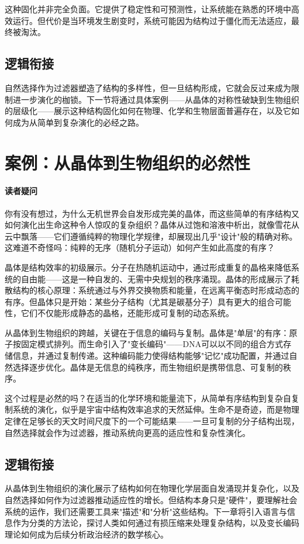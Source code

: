 \documentclass[openany, a4paper, 12pt]{book}
\begin{document}
	这种固化并非完全负面。它提供了稳定性和可预测性，让系统能在熟悉的环境中高效运行。但代价是当环境发生剧变时，系统可能因为结构过于僵化而无法适应，最终被淘汰。
	
	\subsection{逻辑衔接}
	自然选择作为过滤器塑造了结构的多样性，但一旦结构形成，它就会反过来成为限制进一步演化的枷锁。下一节将通过具体案例——从晶体的对称性破缺到生物组织的层级化——展示这种结构固化如何在物理、化学和生物层面普遍存在，以及它如何成为从简单到复杂演化的必经之路。
	
	\section{案例：从晶体到生物组织的必然性}

\begin{questionbox}
\paragraph*{读者疑问}
你有没有想过，为什么无机世界会自发形成完美的晶体，而这些简单的有序结构又如何演化出生命这种令人惊叹的复杂组织？晶体从过饱和溶液中析出，就像雪花从云中飘落——它们遵循纯粹的物理化学规律，却展现出几乎"设计"般的精确对称。这难道不奇怪吗：纯粹的无序（随机分子运动）如何产生如此高度的有序？
\end{questionbox}

晶体是结构效率的初级展示。分子在热随机运动中，通过形成重复的晶格来降低系统的自由能——这是一种自发的、无需中央规划的秩序涌现。晶体的形成展示了耗散结构的核心原理：系统通过与外界交换物质和能量，在远离平衡态时形成动态的有序。但晶体只是开始：某些分子结构（尤其是碳基分子）具有更大的组合可能性，它们不仅能形成静态的晶格，还能形成可复制的动态系统。

从晶体到生物组织的跨越，关键在于信息的编码与复制。晶体是"单层"的有序：原子按固定模式排列。而生命引入了"变长编码"——DNA可以以不同的组合方式存储信息，并通过复制传递。这种编码能力使得结构能够"记忆"成功配置，并通过自然选择逐步优化。晶体是无信息的纯秩序，而生物组织是携带信息、可复制的秩序。

这个过程是必然的吗？在适当的化学环境和能量流下，从简单有序结构到复杂自复制系统的演化，似乎是宇宙中结构效率追求的天然延伸。生命不是奇迹，而是物理定律在足够长的天文时间尺度下的一个可能结果——一旦可复制的分子结构出现，自然选择就会作为过滤器，推动系统向更高的适应性和复杂性演化。

\subsection{逻辑衔接}
从晶体到生物组织的演化展示了结构如何在物理化学层面自发涌现并复杂化，以及自然选择如何作为过滤器推动适应性的增长。但结构本身只是"硬件"，要理解社会系统的运作，我们还需要工具来"描述"和"分析"这些结构。下一章将引入语言与信息作为分类的方法论，探讨人类如何通过有损压缩来处理复杂结构，以及变长编码理论如何成为后续分析政治经济的数学核心。
	
\end{document}
